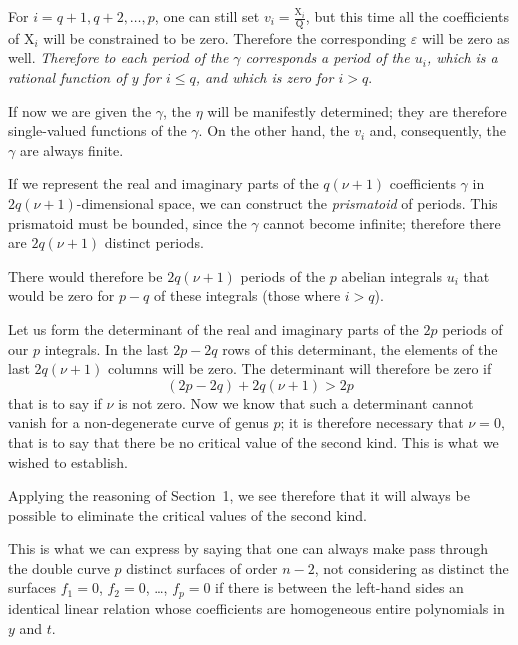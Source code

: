 \documentclass{article}
\begin{document}
For $i = q+1, q+2, \dots, p$, one can still set $v_{i} = \frac{\mathrm{X}_{i}}{\mathrm{Q}}$, but this time all the coefficients of $\mathrm{X}_{i}$ will be constrained to be zero. Therefore the corresponding $\varepsilon$ will be zero as well. \emph{Therefore to each period of the $\gamma$ corresponds a period of the $u_{i}$, which is a rational function of $y$ for $i \le q$, and which is zero for $i > q$}.

If now we are given the $\gamma$, the $\eta$ will be manifestly determined; they are therefore single-valued functions of the $\gamma$. On the other hand, the $v_{i}$ and, consequently, the $\gamma$ are always finite.

If we represent the real and imaginary parts of the $q(\nu+1)$ coefficients $\gamma$ in $2q(\nu+1)$-dimensional space, we can construct the \emph{prismatoid} of periods. This prismatoid must be bounded, since the $\gamma$ cannot become infinite; therefore there are $2q(\nu+1)$ distinct periods.

There would therefore be $2q(\nu+1)$ periods of the $p$ abelian integrals $u_{i}$ that would be zero for $p-q$ of these integrals (those where $i > q$).

Let us form the determinant of the real and imaginary parts of the $2p$ periods of our $p$ integrals. In the last $2p - 2q$ rows of this determinant, the elements of the last $2q(\nu+1)$ columns will be zero. The determinant will therefore be zero if
\[
(2p - 2q) + 2q(\nu+1) > 2p
\]
that is to say if $\nu$ is not zero. Now we know that such a determinant cannot vanish for a non-degenerate curve of genus $p$; it is therefore necessary that $\nu = 0$, that is to say that there be no critical value of the second kind. This is what we wished to establish.

Applying the reasoning of Section~1, we see therefore that it will always be possible to eliminate the critical values of the second kind.

This is what we can express by saying that one can always make pass through the double curve $p$ distinct surfaces of order $n-2$, not considering as distinct the surfaces $f_{1}=0$, $f_{2}=0$, \dots, $f_{p}=0$ if there is between the left-hand sides an identical linear relation whose coefficients are homogeneous entire polynomials in $y$ and $t$.
\end{document}
